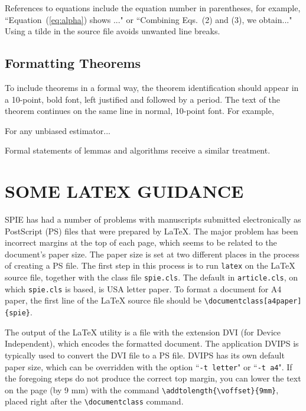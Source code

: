 \documentclass[]{spie}  %
\begin{document}
References to equations include the equation number in parentheses, for example, ``Equation~(\ref{eq:alpha}) shows ..." or ``Combining Eqs.~(2) and (3), we obtain..."  Using a tilde in the source file avoids unwanted line breaks.

\subsection{Formatting Theorems} 

To include theorems in a formal way, the theorem identification should appear in a 10-point, bold font, left justified and followed by a period.  The text of the theorem continues on the same line in normal, 10-point font.  For example, 

 For any unbiased estimator...

Formal statements of lemmas and algorithms receive a similar treatment.

\section{SOME LATEX GUIDANCE} \label{sect:latex}

SPIE has had a number of problems with manuscripts submitted electronically as PostScript (PS) files that were prepared by LaTeX.  The major problem has been incorrect margins at the top of each page, which seems to be related to the document's paper size. The paper size is set at two different places in the process of creating a PS file.  The first step in this process is to run {\tt latex} on the LaTeX source file, together with the class file {\tt spie.cls}.  The default in {\tt article.cls}, on which {\tt spie.cls} is based, is USA letter paper.  To format a document for A4 paper, the first line of the LaTeX source file should be \verb|\documentclass[a4paper]{spie}|.   

The output of the LaTeX utility is a file with the extension DVI (for Device Independent), which encodes the formatted document.  The application DVIPS is typically used to convert the DVI file to a PS file.  DVIPS has its own default paper size, which can be overridden with the option ``{\tt -t letter}" or ``{\tt -t a4}".  
If the foregoing steps do not produce the correct top margin, you can lower the text on the page (by 9 mm) with the command \verb|\addtolength{\voffset}{9mm}|, placed right after the \verb|\documentclass| command.
\end{document}
